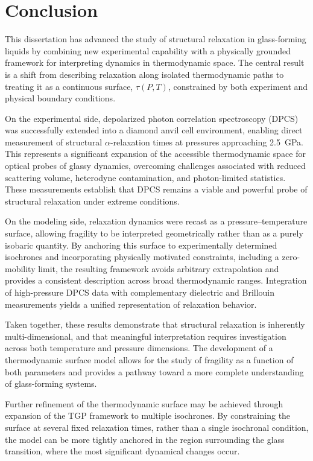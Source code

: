 \chapter{Conclusion}

This dissertation has advanced the study of structural relaxation in glass-forming liquids by combining new experimental capability with a physically grounded framework for interpreting dynamics in thermodynamic space. The central result is a shift from describing relaxation along isolated thermodynamic paths to treating it as a continuous surface, $\tau(P,T)$, constrained by both experiment and physical boundary conditions.

On the experimental side, depolarized photon correlation spectroscopy (DPCS) was successfully extended into a diamond anvil cell environment, enabling direct measurement of structural $\alpha$-relaxation times at pressures approaching 2.5~GPa. This represents a significant expansion of the accessible thermodynamic space for optical probes of glassy dynamics, overcoming challenges associated with reduced scattering volume, heterodyne contamination, and photon-limited statistics. These measurements establish that DPCS remains a viable and powerful probe of structural relaxation under extreme conditions.

On the modeling side, relaxation dynamics were recast as a pressure--temperature surface, allowing fragility to be interpreted geometrically rather than as a purely isobaric quantity. By anchoring this surface to experimentally determined isochrones and incorporating physically motivated constraints, including a zero-mobility limit, the resulting framework avoids arbitrary extrapolation and provides a consistent description across broad thermodynamic ranges. Integration of high-pressure DPCS data with complementary dielectric and Brillouin measurements yields a unified representation of relaxation behavior.

Taken together, these results demonstrate that structural relaxation is inherently multi-dimensional, and that meaningful interpretation requires investigation across both temperature and pressure dimensions. The development of a thermodynamic surface model allows for the study of fragility as a function of both parameters and provides a pathway toward a more complete understanding of glass-forming systems.

Further refinement of the thermodynamic surface may be achieved through expansion of the TGP framework to multiple isochrones. By constraining the surface at several fixed relaxation times, rather than a single isochronal condition, the model can be more tightly anchored in the region surrounding the glass transition, where the most significant dynamical changes occur.

